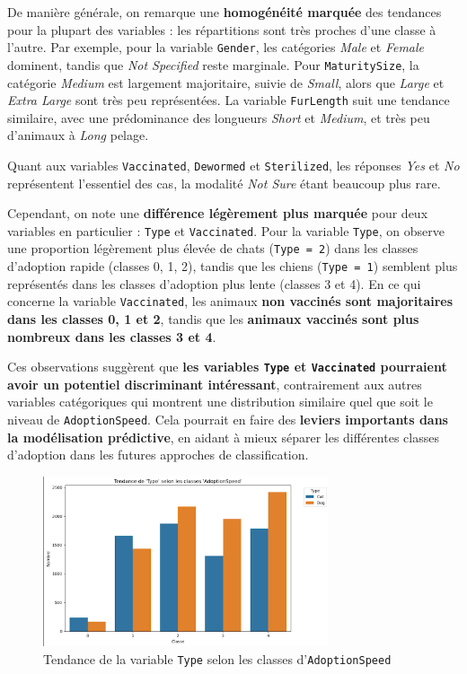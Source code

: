 \documentclass[a4paper,12pt]{article}
\begin{document}
De manière générale, on remarque une \textbf{homogénéité marquée} des tendances pour la plupart des variables : les répartitions sont très proches d’une classe à l’autre. Par exemple, pour la variable \texttt{Gender}, les catégories \textit{Male} et \textit{Female} dominent, tandis que \textit{Not Specified} reste marginale. Pour \texttt{MaturitySize}, la catégorie \textit{Medium} est largement majoritaire, suivie de \textit{Small}, alors que \textit{Large} et \textit{Extra Large} sont très peu représentées. La variable \texttt{FurLength} suit une tendance similaire, avec une prédominance des longueurs \textit{Short} et \textit{Medium}, et très peu d’animaux à \textit{Long} pelage.
 
Quant aux variables \texttt{Vaccinated}, \texttt{Dewormed} et \texttt{Sterilized}, les réponses \textit{Yes} et \textit{No} représentent l'essentiel des cas, la modalité \textit{Not Sure} étant beaucoup plus rare.
 
Cependant, on note une \textbf{différence légèrement plus marquée} pour deux variables en particulier : \texttt{Type} et \texttt{Vaccinated}. Pour la variable \texttt{Type}, on observe une proportion légèrement plus élevée de chats (\texttt{Type = 2}) dans les classes d’adoption rapide (classes 0, 1, 2), tandis que les chiens (\texttt{Type = 1}) semblent plus représentés dans les classes d’adoption plus lente (classes 3 et 4). En ce qui concerne la variable \texttt{Vaccinated}, les animaux \textbf{non vaccinés sont majoritaires dans les classes 0, 1 et 2}, tandis que les \textbf{animaux vaccinés sont plus nombreux dans les classes 3 et 4}.
 
Ces observations suggèrent que \textbf{les variables \texttt{Type} et \texttt{Vaccinated} pourraient avoir un potentiel discriminant intéressant}, contrairement aux autres variables catégoriques qui montrent une distribution similaire quel que soit le niveau de \texttt{AdoptionSpeed}. Cela pourrait en faire des \textbf{leviers importants dans la modélisation prédictive}, en aidant à mieux séparer les différentes classes d’adoption dans les futures approches de classification.
\begin{figure}[H]
    \centering
    \includegraphics[width=0.75\textwidth]{type_adoption_trend.png}
    \caption{Tendance de la variable \texttt{Type} selon les classes d'\texttt{AdoptionSpeed}}
    \label{fig:type_trend}
\end{figure}
\end{document}
